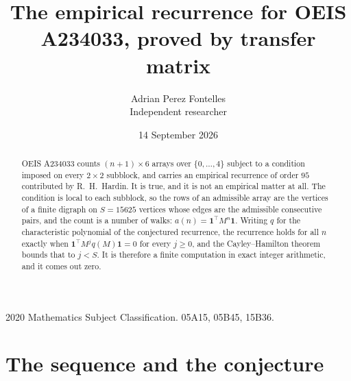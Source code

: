 \documentclass[11pt,a4paper]{article}
\title{The empirical recurrence for OEIS A234033, proved by transfer matrix}
\author{Adrian Perez Fontelles\\ \small Independent researcher}
\date{14 September 2026}
\theoremstyle{plain}
\theoremstyle{definition}
\begin{document}
\maketitle

\begin{abstract}
OEIS A234033 counts $(n+1)\times6$ arrays over $\{0,\dots,4\}$ subject to a condition imposed on
every $2\times2$ subblock, and carries an empirical recurrence of order $95$ contributed
by R.~H.~Hardin. It is true, and it is not an empirical matter at all. The condition is local
to each subblock, so the rows of an admissible array are the vertices of a finite digraph
on $S=15625$ vertices whose edges are the admissible consecutive pairs, and the count is a
number of walks: $a(n)=\mathbf{1}^{\!\top}M^{n}\mathbf{1}$. Writing $q$
for the characteristic polynomial of the conjectured recurrence, the recurrence holds for all
$n$ exactly when $\mathbf{1}^{\!\top}M^{j}q(M)\mathbf{1}=0$ for every $j\ge0$, and the
Cayley--Hamilton theorem bounds that to $j<S$. It is therefore a finite computation in exact
integer arithmetic, and it comes out zero.
\end{abstract}

\noindent\small 2020 Mathematics Subject Classification. 05A15, 05B45, 15B36.\normalsize

\section{The sequence and the conjecture}
\end{document}
